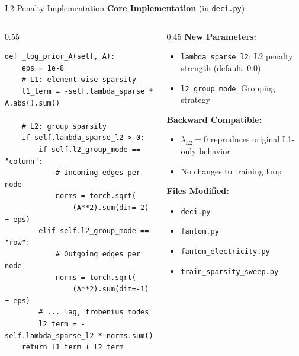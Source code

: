 \documentclass[aspectratio=169]{beamer}
\begin{document}
\begin{frame}[fragile]{L2 Penalty Implementation}
\textbf{Core Implementation} (in \texttt{deci.py}):

\begin{columns}
\begin{column}{0.55\textwidth}
\scriptsize
\begin{verbatim}
def _log_prior_A(self, A):
    eps = 1e-8
    # L1: element-wise sparsity
    l1_term = -self.lambda_sparse * A.abs().sum()

    # L2: group sparsity
    if self.lambda_sparse_l2 > 0:
        if self.l2_group_mode == "column":
            # Incoming edges per node
            norms = torch.sqrt(
                (A**2).sum(dim=-2) + eps)
        elif self.l2_group_mode == "row":
            # Outgoing edges per node
            norms = torch.sqrt(
                (A**2).sum(dim=-1) + eps)
        # ... lag, frobenius modes
        l2_term = -self.lambda_sparse_l2 * norms.sum()
    return l1_term + l2_term
\end{verbatim}
\end{column}

\begin{column}{0.45\textwidth}
\textbf{New Parameters:}
\begin{itemize}
    \item \texttt{lambda\_sparse\_l2}: L2 penalty strength (default: 0.0)
    \item \texttt{l2\_group\_mode}: Grouping strategy
\end{itemize}

\vspace{0.1cm}
\textbf{Backward Compatible:}
\begin{itemize}
    \item $\lambda_{\text{L2}} = 0$ reproduces original L1-only behavior
    \item No changes to training loop
\end{itemize}

\vspace{0.1cm}
\textbf{Files Modified:}
\begin{itemize}
    \item \texttt{deci.py}
    \item \texttt{fantom.py}
    \item \texttt{fantom\_electricity.py}
    \item \texttt{train\_sparsity\_sweep.py}
\end{itemize}
\end{column}
\end{columns}
\end{frame}
\end{document}
